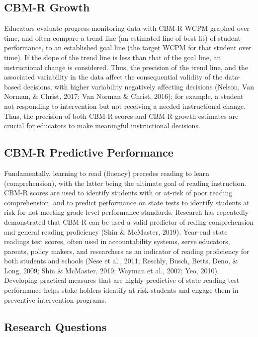 \documentclass[
  english,
  man, fleqn, noextraspace]{apa6}
\begin{document}
\hypertarget{cbm-r-growth}{%
\subsection{CBM-R Growth}\label{cbm-r-growth}}

Educators evaluate progress-monitoring data with CBM-R WCPM graphed over time, and often compare a trend line (an estimated line of best fit) of student performance, to an established goal line (the target WCPM for that student over time). If the slope of the trend line is less than that of the goal line, an instructional change is considered. Thus, the precision of the trend line, and the associated variability in the data affect the consequential validity of the data-based decisions, with higher variability negatively affecting decisions (Nelson, Van Norman, \& Christ, 2017; Van Norman \& Christ, 2016); for example, a student not responding to intervention but not receiving a needed instructional change. Thus, the precision of both CBM-R scores and CBM-R growth estimates are crucial for educators to make meaningful instructional decisions.

\hypertarget{cbm-r-predictive-performance}{%
\subsection{CBM-R Predictive Performance}\label{cbm-r-predictive-performance}}

Fundamentally, learning to read (fluency) precedes reading to learn (comprehension), with the latter being the ultimate goal of reading instruction. CBM-R scores are used to identify students with or at-risk of poor reading comprehension, and to predict performance on state tests to identify students at risk for not meeting grade-level performance standards. Research has repeatedly demonstrated that CBM-R can be used a valid predictor of reding comprehension and general reading proficiency (Shin \& McMaster, 2019). Year-end state readings test scores, often used in accountability systems, serve educators, parents, policy makers, and researchers as an indicator of reading proficiency for both students and schools (Nese et al., 2011; Reschly, Busch, Betts, Deno, \& Long, 2009; Shin \& McMaster, 2019; Wayman et al., 2007; Yeo, 2010). Developing practical measures that are highly predictive of state reading test performance helps stake holders identify at-risk students and engage them in preventive intervention programs.

\hypertarget{research-questions}{%
\subsection{Research Questions}\label{research-questions}}
\end{document}
